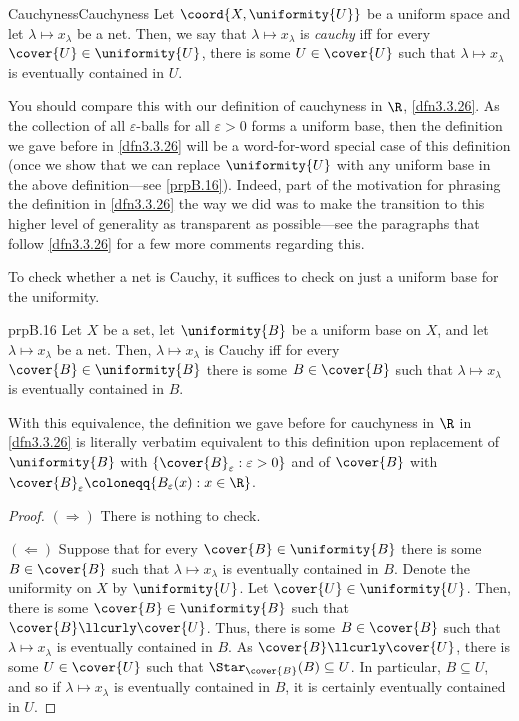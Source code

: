 \begin{dfn}{Cauchyness}{Cauchyness}
Let $\coord{X,\uniformity{U}}$ be a uniform space and let $\lambda \mapsto x_\lambda$ be a net.  Then, we say that $\lambda \mapsto x_\lambda$ is \emph{cauchy} iff for every $\cover{U}\in \uniformity{U}$, there is some $U\in \cover{U}$ such that $\lambda \mapsto x_\lambda$ is eventually contained in $U$.
\begin{rmk}
You should compare this with our definition of cauchyness in $\R$, \cref{dfn3.3.26}.  As the collection of all $\varepsilon$-balls for all $\varepsilon >0$ forms a uniform base, then the definition we gave before in \cref{dfn3.3.26} will be a word-for-word special case of this definition (once we show that we can replace $\uniformity{U}$ with any uniform base in the above definition---see \cref{prpB.16}).  Indeed, part of the motivation for phrasing the definition in \cref{dfn3.3.26} the way we did was to make the transition to this higher level of generality as transparent as possible---see the paragraphs that follow \cref{dfn3.3.26} for a few more comments regarding this.
\end{rmk}
\end{dfn}
To check whether a net is Cauchy, it suffices to check on just a uniform base for the uniformity.
\begin{prp}{}{prpB.16}
Let $X$ be a set, let $\uniformity{B}$ be a uniform base on $X$, and let $\lambda \mapsto x_\lambda$ be a net.  Then, $\lambda \mapsto x_\lambda$ is Cauchy iff for every $\cover{B}\in \uniformity{B}$ there is some $B\in \cover{B}$ such that $\lambda \mapsto x_\lambda$ is eventually contained in $B$.
\begin{rmk}
With this equivalence, the definition we gave before for cauchyness in $\R$ in \cref{dfn3.3.26} is literally verbatim equivalent to this definition upon replacement of $\uniformity{B}$ with $\{ \cover{B}_\varepsilon :\varepsilon >0\}$ and of $\cover{B}$ with $\cover{B}_\varepsilon \coloneqq \{ B_\varepsilon (x):x\in \R \}$.
\end{rmk}
\begin{proof}
$(\Rightarrow )$ There is nothing to check.

\blankline
\noindent
$(\Leftarrow )$ Suppose that for every $\cover{B}\in \uniformity{B}$ there is some $B\in \cover{B}$ such that $\lambda \mapsto x_\lambda$ is eventually contained in $B$.  Denote the uniformity on $X$ by $\uniformity{U}$.  Let $\cover{U}\in \uniformity{U}$.  Then, there is some $\cover{B}\in \uniformity{B}$ such that $\cover{B}\llcurly \cover{U}$.  Thus, there is some $B\in \cover{B}$ such that $\lambda \mapsto x_\lambda$ is eventually contained in $B$.  As $\cover{B}\llcurly \cover{U}$, there is some $U\in \cover{U}$ such that $\Star _{\cover{B}}(B)\subseteq U$.   In particular, $B\subseteq U$, and so if $\lambda \mapsto x_\lambda$ is eventually contained in $B$, it is certainly eventually contained in $U$.
\end{proof}
\end{prp}
